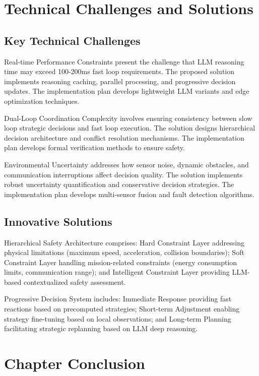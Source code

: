 \section{Technical Challenges and Solutions}

\subsection{Key Technical Challenges}

Real-time Performance Constraints present the challenge that LLM reasoning time may exceed 100-200ms fast loop requirements. The proposed solution implements reasoning caching, parallel processing, and progressive decision updates. The implementation plan develops lightweight LLM variants and edge optimization techniques.

Dual-Loop Coordination Complexity involves ensuring consistency between slow loop strategic decisions and fast loop execution. The solution designs hierarchical decision architecture and conflict resolution mechanisms. The implementation plan develops formal verification methods to ensure safety.

Environmental Uncertainty addresses how sensor noise, dynamic obstacles, and communication interruptions affect decision quality. The solution implements robust uncertainty quantification and conservative decision strategies. The implementation plan develops multi-sensor fusion and fault detection algorithms.

\subsection{Innovative Solutions}

Hierarchical Safety Architecture comprises: Hard Constraint Layer addressing physical limitations (maximum speed, acceleration, collision boundaries); Soft Constraint Layer handling mission-related constraints (energy consumption limits, communication range); and Intelligent Constraint Layer providing LLM-based contextualized safety assessment.

Progressive Decision System includes: Immediate Response providing fast reactions based on precomputed strategies; Short-term Adjustment enabling strategy fine-tuning based on local observations; and Long-term Planning facilitating strategic replanning based on LLM deep reasoning.

\section{Chapter Conclusion}

